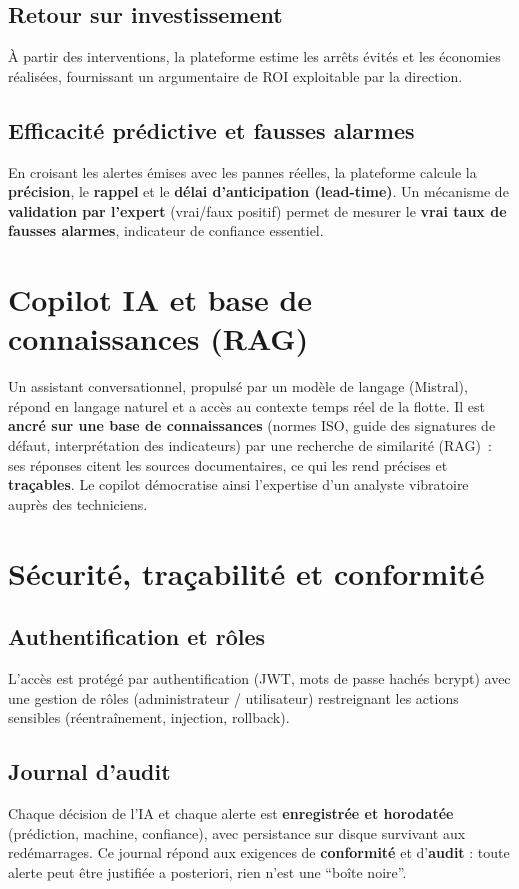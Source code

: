 \documentclass[12pt,a4paper]{article}
\begin{document}
\subsection{Retour sur investissement}
À partir des interventions, la plateforme estime les arrêts évités et les économies
réalisées, fournissant un argumentaire de ROI exploitable par la direction.

\subsection{Efficacité prédictive et fausses alarmes}
En croisant les alertes émises avec les pannes réelles, la plateforme calcule la
\textbf{précision}, le \textbf{rappel} et le \textbf{délai d'anticipation (lead-time)}.
Un mécanisme de \textbf{validation par l'expert} (vrai/faux positif) permet de mesurer le
\textbf{vrai taux de fausses alarmes}, indicateur de confiance essentiel.

\section{Copilot IA et base de connaissances (RAG)}
Un assistant conversationnel, propulsé par un modèle de langage (Mistral), répond en
langage naturel et a accès au contexte temps réel de la flotte. Il est \textbf{ancré sur
une base de connaissances} (normes ISO, guide des signatures de défaut, interprétation des
indicateurs) par une recherche de similarité (RAG)~: ses réponses citent les sources
documentaires, ce qui les rend précises et \textbf{traçables}. Le copilot démocratise
ainsi l'expertise d'un analyste vibratoire auprès des techniciens.

\section{Sécurité, traçabilité et conformité}

\subsection{Authentification et rôles}
L'accès est protégé par authentification (JWT, mots de passe hachés bcrypt) avec une
gestion de rôles (administrateur / utilisateur) restreignant les actions sensibles
(réentraînement, injection, rollback).

\subsection{Journal d'audit}
Chaque décision de l'IA et chaque alerte est \textbf{enregistrée et horodatée}
(prédiction, machine, confiance), avec persistance sur disque survivant aux redémarrages.
Ce journal répond aux exigences de \textbf{conformité} et d'\textbf{audit} : toute alerte
peut être justifiée a posteriori, rien n'est une ``boîte noire''.
\end{document}
